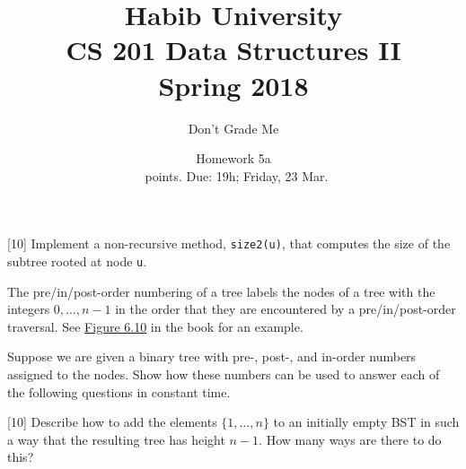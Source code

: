 \documentclass[addpoints]{exam}
\title{Habib University\\CS 201 Data Structures II\\Spring 2018}
\author{Don't Grade Me}  %
\date{Homework 5a\\\numpoints\ points. Due: 19h; Friday, 23 Mar.}
\begin{document}
\maketitle

\begin{questions}

  [10]
  Implement a non-recursive method, {\tt size2(u)}, that computes
  the size of the subtree rooted at node {\tt u}.
  \begin{solution}
  \end{solution}

  The pre/in/post-order numbering of a tree labels the nodes of a tree with the integers $0,\ldots,n − 1$ in the order that they are encountered by a pre/in/post-order traversal. See \href{http://opendatastructures.org/ods-python/6_3_Discussion_Exercises.html#fig:binarytree-numbering}{Figure 6.10} in the book for an example.

  Suppose we are given a binary tree with pre-, post-, and in-order numbers assigned to the nodes. Show how these numbers can be used to answer each of the following questions in constant time.

  [10]
  Describe how to add the elements $\{1,\ldots,n\}$ to an initially empty BST in such a way that the resulting tree has height $n-1$. How many ways are there to do this?
  \begin{solution}
  \end{solution}


\end{questions}
\end{document}
